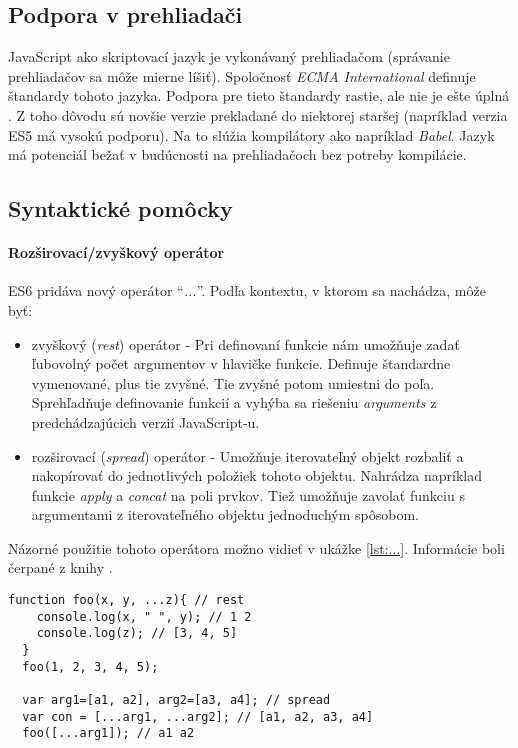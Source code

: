 \subsection{Podpora v prehliadači}
JavaScript ako skriptovací jazyk je vykonávaný prehliadačom (správanie prehliadačov sa môže mierne líšiť). Spoločnosť \emph{ECMA International} definuje štandardy tohoto jazyka. Podpora pre tieto štandardy rastie, ale nie je ešte úplná \cite{podporaES7}. 
Z toho dôvodu sú novšie verzie prekladané do niektorej staršej (napríklad verzia ES5 má vysokú podporu). Na to slúžia kompilátory ako napríklad \emph{Babel}. Jazyk \JS{} má potenciál bežať v budúcnosti na prehliadačoch bez potreby kompilácie.

\subsection{Syntaktické pomôcky}

\paragraph{Rozširovací/zvyškový operátor}
\label{par:spreadOp}
ES6 pridáva nový operátor ``\emph{...}''. Podľa kontextu, v ktorom sa nachádza, môže byť:
\begin{itemize}
  \item zvyškový (\emph{rest}) operátor - Pri definovaní funkcie nám umožňuje zadať ľubovolný počet argumentov v hlavičke funkcie. Definuje štandardne vymenované, plus tie zvyšné. Tie zvyšné potom umiestni do poľa. Sprehľadňuje definovanie funkcií a vyhýba sa riešeniu \emph{arguments} z predchádzajúcich verzií JavaScript-u.
  \item rozširovací (\emph{spread}) operátor - Umožňuje iterovateľný objekt rozbaliť a nakopírovať do jednotlivých položiek tohoto objektu. Nahrádza napríklad funkcie \emph{apply} a \emph{concat} na poli prvkov. Tiež umožňuje zavolať funkciu s argumentami z iterovateľného objektu jednoduchým spôsobom.
\end{itemize}
Názorné použitie tohoto operátora možno vidieť v ukážke \ref{lst:...}.
Informácie boli čerpané z knihy \cite[Exploring ES6]{expES6}.

\begin{lstlisting}[caption=rozširovací/zvyškový operátor, label={lst:...}]
  function foo(x, y, ...z){ // rest
    console.log(x, " ", y); // 1 2
    console.log(z); // [3, 4, 5]
  }
  foo(1, 2, 3, 4, 5);

  var arg1=[a1, a2], arg2=[a3, a4]; // spread
  var con = [...arg1, ...arg2]; // [a1, a2, a3, a4]
  foo([...arg1]); // a1 a2
\end{lstlisting}

